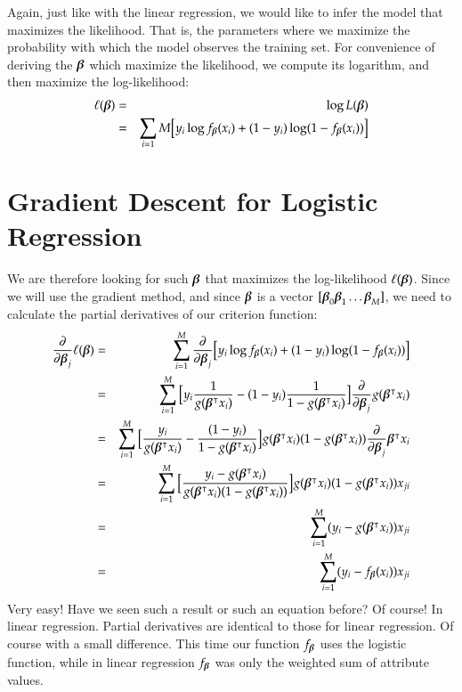 \begin{refsection}
Again, just like with the linear regression, we would like to infer the model that maximizes the likelihood. That is, the parameters where we maximize the probability with which the model observes the training set. For convenience of deriving the $\boldsymbol{\beta}$ which maximize the likelihood, we compute its logarithm, and then maximize the log-likelihood:
\begin{eqnarray}
  \ell(\boldsymbol{\beta}) & = & \log L(\boldsymbol{\beta}) \nonumber\\
  & = & \sum_{i=1}M\big[y_i\log f_{\boldsymbol{\beta}}(x_i)+(1-y_i)\log (1-f_{\boldsymbol{\beta}}(x_i)) \big]
\end{eqnarray}

\section{Gradient Descent for Logistic Regression}
We are therefore looking for such $\boldsymbol{\beta}$ that maximizes the log-likelihood $\ell(\boldsymbol{\beta})$. Since we will use the gradient method, and since $\boldsymbol{\beta}$ is a vector $[\boldsymbol{\beta}_0  \boldsymbol{\beta}_1 \ldots \boldsymbol{\beta}_M] $, we need to calculate the partial derivatives of our criterion function:
\begin{eqnarray}
  \frac{\partial}{\partial\boldsymbol{\beta}_j}\ell(\boldsymbol{\beta})
  & = & \sum_{i=1}^M \frac{\partial}{\partial\boldsymbol{\beta}_j} \big[y_i\log f_{\boldsymbol{\beta}}(x_i)+(1-y_i)\log (1-f_{\boldsymbol{\beta}}(x_i)) \big] \nonumber \\
  & = & \sum_{i=1}^M \big[y_i\frac{1}{g(\boldsymbol{\beta}^\intercal x_i)}-(1-y_i)\frac{1}{1-g(\boldsymbol{\beta}^\intercal x_i)} \big]\frac{\partial}{\partial\boldsymbol{\beta}_j}g(\boldsymbol{\beta}^\intercal x_i) \nonumber\\
  & = & \sum_{i=1}^M \big[\frac{y_i}{g(\boldsymbol{\beta}^\intercal x_i)}-\frac{(1-y_i)}{1-g(\boldsymbol{\beta}^\intercal x_i)} \big]g(\boldsymbol{\beta}^\intercal x_i)(1-g(\boldsymbol{\beta}^\intercal x_i))
  \frac{\partial}{\partial\boldsymbol{\beta}_j}\boldsymbol{\beta}^\intercal x_i\nonumber\\
  & = & \sum_{i=1}^M \big[\frac{y_i - g(\boldsymbol{\beta}^\intercal x_i)} {g(\boldsymbol{\beta}^\intercal x_i)(1-g(\boldsymbol{\beta}^\intercal x_i))} \big]g(\boldsymbol{\beta}^\intercal x_i)(1-g(\boldsymbol{\beta}^\intercal x_i)) x_{ji}\nonumber\\
  & = & \sum_{i=1}^M (y_i-g(\boldsymbol{\beta}^\intercal x_i))x_{ji}\nonumber\\
  & = & \sum_{i=1}^M (y_i-f_{\boldsymbol{\beta}}(x_i))x_{ji}
  \label{eq:logreg-grad}
\end{eqnarray}
Very easy! Have we seen such a result or such an equation before? Of course! In linear regression. Partial derivatives are identical to those for linear regression. Of course with a small difference. This time our function $f_{\boldsymbol{\beta}}$ uses the logistic function, while in linear regression $f_{\boldsymbol{\beta}}$ was only the weighted sum of attribute values.


\end{refsection}
